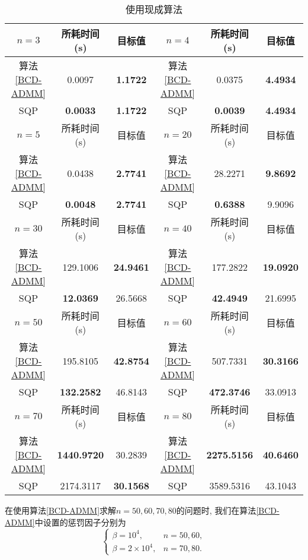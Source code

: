 \begin{table}[htbp]
	\renewcommand{\captionfont}{\small}
	\centering
	\caption{\small 使用现成算法}
	\label{already exist}
	\vskip 4mm
	\begin{tabular}{c|c|c||c|c|c}
		\hline
		$n=3$ & 所耗时间 (s) & 目标值 & $n=4$ & 所耗时间 (s) & 目标值\\\hline
		算法\ref{BCD-ADMM} & 0.0097 & \textbf{1.1722} & 算法\ref{BCD-ADMM} & 0.0375 & \textbf{4.4934}\\\hline
		SQP & \textbf{0.0033} & \textbf{1.1722} & SQP & \textbf{0.0039} & \textbf{4.4934}\\\hline
		\hline
		$n=5$ & 所耗时间 (s) & 目标值 & $n=20$ & 所耗时间 (s) & 目标值\\\hline
		算法\ref{BCD-ADMM} & 0.0438 & \textbf{2.7741} & 算法\ref{BCD-ADMM} & 28.2271 & \textbf{9.8692}\\\hline
		SQP & \textbf{0.0048} & \textbf{2.7741} & SQP & \textbf{0.6388} & 9.9096\\\hline
		\hline
		$n=30$ & 所耗时间 (s) & 目标值 & $n=40$ & 所耗时间 (s) & 目标值\\\hline
		算法\ref{BCD-ADMM} & 129.1006 & \textbf{24.9461} & 算法\ref{BCD-ADMM} & 177.2822 & \textbf{19.0920}\\\hline
		SQP & \textbf{12.0369} & 26.5668 & SQP & \textbf{42.4949} & 21.6995\\\hline
		\hline
		$n=50$ & 所耗时间 (s) & 目标值 & $n=60$ & 所耗时间 (s) & 目标值\\\hline
		算法\ref{BCD-ADMM} & 195.8105 & \textbf{42.8754} & 算法\ref{BCD-ADMM} & 507.7331 & \textbf{30.3166}\\\hline
		SQP & \textbf{132.2582} & 46.8143 & SQP & \textbf{472.3746} & 33.0913\\\hline
		\hline
		$n=70$ & 所耗时间 (s) & 目标值 & $n=80$ & 所耗时间 (s) & 目标值\\\hline
		算法\ref{BCD-ADMM} & \textbf{1440.9720} & 30.2839 & 算法\ref{BCD-ADMM} & \textbf{2275.5156} & \textbf{40.6460} \\\hline
		SQP & 2174.3117 & \textbf{30.1568} & SQP & 3589.5316 & 43.1043\\\hline
		
	\end{tabular}
\end{table}
在使用算法\ref{BCD-ADMM}求解$n=50,60,70,80$的问题时, 我们在算法\ref{BCD-ADMM}中设置的惩罚因子分别为
$$\left\{\begin{array}{ll}
	\beta=10^4, & n=50,60,\\
	\beta=2\times10^4, & n=70,80.
\end{array}\right.$$
